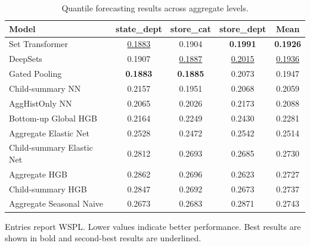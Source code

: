 \begin{table}[H]
\centering
\caption{Quantile forecasting results across aggregate levels.}
\label{tab:main_quantile}
\begin{threeparttable}
\begin{tabular}{lcccc}
\toprule
Model & state\_dept & store\_cat & store\_dept & Mean \\
\midrule
Set Transformer & \underline{0.1883} & 0.1904 & \textbf{0.1991} & \textbf{0.1926} \\
DeepSets & 0.1907 & \underline{0.1887} & \underline{0.2015} & \underline{0.1936} \\
Gated Pooling & \textbf{0.1883} & \textbf{0.1885} & 0.2073 & 0.1947 \\
Child-summary NN & 0.2157 & 0.1951 & 0.2068 & 0.2059 \\
AggHistOnly NN & 0.2065 & 0.2026 & 0.2173 & 0.2088 \\
Bottom-up Global HGB & 0.2164 & 0.2249 & 0.2430 & 0.2281 \\
Aggregate Elastic Net & 0.2528 & 0.2472 & 0.2542 & 0.2514 \\
Child-summary Elastic Net & 0.2812 & 0.2693 & 0.2685 & 0.2730 \\
Aggregate HGB & 0.2862 & 0.2696 & 0.2623 & 0.2727 \\
Child-summary HGB & 0.2847 & 0.2692 & 0.2673 & 0.2737 \\
Aggregate Seasonal Naive & 0.2673 & 0.2683 & 0.2871 & 0.2743 \\
\bottomrule
\end{tabular}
\begin{tablenotes}
\footnotesize \item Entries report WSPL. Lower values indicate better performance. Best results are shown in bold and second-best results are underlined.
\end{tablenotes}
\end{threeparttable}
\end{table}
